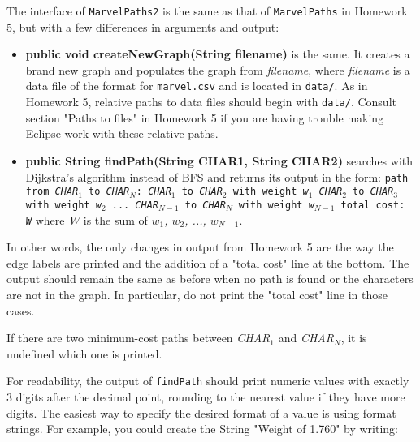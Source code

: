 \documentclass[11pt]{article}
\begin{document}
The interface of \texttt{MarvelPaths2} is the same as that of \texttt{MarvelPaths} in Homework 5, but with a few differences in arguments and output:
\begin{itemize}
\item \textbf{public void createNewGraph(String filename)} is the same. It creates a brand new graph and populates the graph from \textit{filename}, where \textit{filename} is a data file of the format for \texttt{marvel.csv} and is located in \texttt{data/}. As in Homework 5, relative paths to data files should begin with 
\texttt{data/}. Consult section "Paths to files" in Homework 5 if you are having trouble making Eclipse work with these relative paths.
\newpage
\item \textbf{public String findPath(String CHAR1, String CHAR2)} searches with Dijkstra's algorithm instead of BFS and returns its output in the form:
\newline
\texttt{path from \textit{CHAR$_1$} to \textit{CHAR$_N$}:
\newline
\textit{CHAR$_1$} to \textit{CHAR$_2$} with weight 
\textit{w$_1$}
\newline
\textit{CHAR$_2$} to \textit{CHAR$_3$} with weight
\textit{w$_2$}
\newline
...
\newline
\textit{CHAR$_{N-1}$} to \textit{CHAR$_N$} with weight \textit{w$_{N-1}$}
\newline
total cost: \textit{W}}
\newline
where \textit{W} is the sum of \textit{$w_1$, $w_2$, ..., $w_{N-1}$}.
\end{itemize}

\noindent In other words, the only changes in output from Homework 5 are the way the edge labels are printed and the addition of a "total cost" line at the bottom. The output should remain the same as before when no path is found or the characters are not in the graph. In particular, do not print the "total cost" line in those cases.

\noindent If there are two minimum-cost paths between \textit{CHAR$_1$} and 
\textit{CHAR$_N$}, it is undefined which one is printed.

\noindent For readability, the output of \texttt{findPath} should print numeric values with exactly 3 digits after the decimal point, rounding to the nearest value if they have more digits. The easiest way to specify the desired format of a value is using format strings. For example, you could create the String "Weight of 1.760" by writing:
\end{document}
